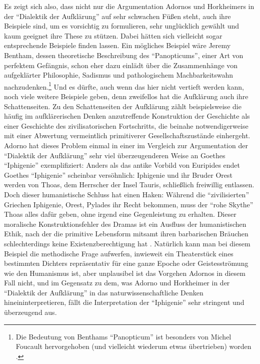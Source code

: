 \documentclass[12pt,a4paper,ngerman]{article}
\begin{document}
Es zeigt sich also, dass nicht nur die Argumentation Adornos und Horkheimers
in der "`Dialektik der Aufklärung"' auf sehr schwachen Füßen steht, auch ihre
Beispiele sind, um es vorsichtig zu formulieren, sehr unglücklich gewählt und
kaum geeignet ihre These zu stützen. Dabei hätten sich vielleicht sogar
entsprechende Beispiele finden lassen. Ein mögliches Beispiel wäre Jeremy
Bentham, dessen theoretische Beschreibung des "`Panopticums"', einer Art von
perfektem Gefängnis, schon eher dazu einlädt über die Zusammenhänge von
aufgeklärter Philosophie, Sadismus und pathologischem Machbarkeitswahn
nachzudenken.\footnote{Die Bedeutung von Benthams "`Panopticum"' ist besonders
von Michel Foucault hervorgehoben (und vielleicht wiederum etwas übertrieben)
worden \cite[S. 256ff.]{foucault:1975}.} Und es dürfte, auch wenn das hier
nicht vertieft werden kann, noch viele weitere Beispiele geben, denn
zweifellos hat die Aufklärung auch ihre Schattenseiten. Zu den Schattenseiten
der Aufklärung zählt beispielsweise die häufig im aufklärerischen Denken
anzutreffende Konstruktion der Geschichte als einer Geschichte des
zivilisatorischen Fortschritts, die beinahe notwendigerweise mit einer
Abwertung vermeintlich primitiverer Gesellschaftszustände einhergeht. Adorno
hat dieses Problem einmal in einer im Vergleich zur Argumentation der
"`Dialektik der Aufklärung"' sehr viel überzeugenderen Weise an Goethes
"`Iphigenie"' exemplifiziert: Anders als das antike Vorbild von Euripides
endet Goethes "`Iphigenie"' scheinbar versöhnlich: Iphigenie und ihr Bruder
Orest werden von Thoas, dem Herrscher der Insel Tauris, schließlich freiwillig
entlassen. Doch dieser humanistische Schluss hat einen Haken: Während die
"`zivilisierten"' Griechen Iphigenie, Orest, Pylades ihr Recht bekommen, muss
der "`rohe Skythe"' Thoas alles dafür geben, ohne irgend eine Gegenleistung zu
erhalten. Dieser moralische Konstruktionsfehler des Dramas ist ein Ausfluss der
humanistischen Ethik, nach der die primitive Lebensform mitsamt ihren
barbarischen Bräuchen schlechterdings keine Existenzberechtigung hat
\cite[S. 509-510]{adorno:1969}. Natürlich kann man bei diesem Beispiel die
methodische Frage aufwerfen, inwieweit ein Theaterstück eines bestimmten
Dichters repräsentativ für eine ganze Epoche oder Geistesströmung wie den
Humanismus ist, aber unplausibel ist das Vorgehen Adornos in diesem Fall
nicht, und im Gegensatz zu dem, was Adorno und Horkheimer in der "`Dialektik
der Aufklärung"' in das naturwissenschaftliche Denken hineininterpretieren,
fällt die Interpretation der "`Iphigenie"' sehr stringent und überzeugend aus.
\end{document}
